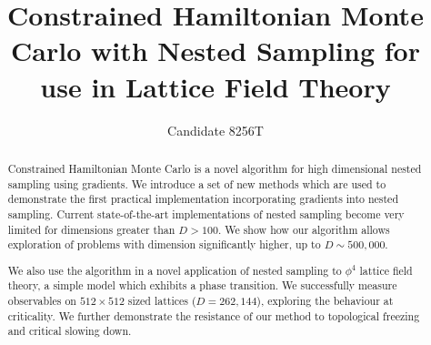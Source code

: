 \documentclass[aps,prd,reprint,preprintnumbers,showpacs,floatfix,nofootinbib,superscript address]{revtex4-2}
\begin{document}
\title{Constrained Hamiltonian Monte Carlo with Nested Sampling for use in Lattice Field Theory}

\author{Candidate 8256T}

\begin{abstract}
     Constrained Hamiltonian Monte Carlo is a novel algorithm for high dimensional nested sampling using gradients.
     We introduce a set of new methods which are used to demonstrate the first
     practical implementation incorporating gradients into nested sampling.
     Current state-of-the-art implementations of nested sampling become very limited for dimensions greater
     than $D > 100$.
     We show how our algorithm allows exploration of problems with dimension significantly higher, up to $D \sim 500,000$.

     We also use the algorithm in a novel application of nested sampling to $\phi^4$ lattice field theory,
     a simple model which exhibits a phase transition.
     We successfully measure observables on $512 \times 512$ sized lattices ($D=262,144$), exploring the behaviour at
     criticality.
     We further demonstrate the resistance of our method to topological freezing and critical slowing down.
\end{abstract}

\maketitle

























\end{document}
